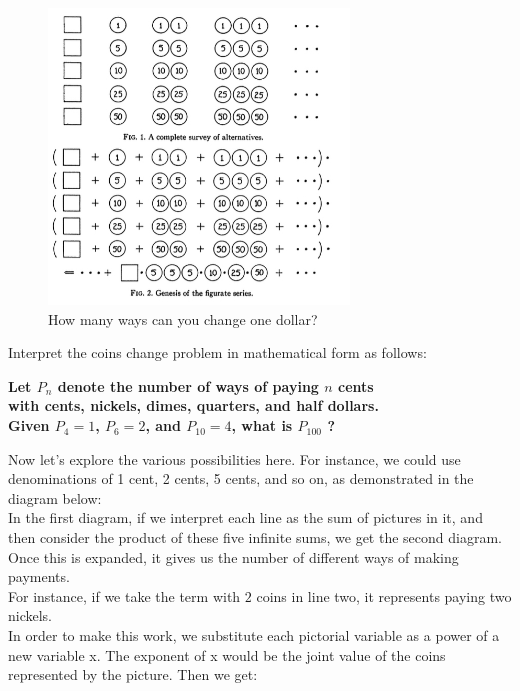 \documentclass{article}
\begin{document}
\begin{figure}[h!]
    \centering
    \includegraphics[width=8cm]{images/coins-change.jpg}
    \caption{How many ways can you change one dollar?}
\end{figure}

\newpage
\noindent Interpret the coins change problem in mathematical form as follows: \\

\noindent 
\begin{center}\textbf{\noindent Let \( P_n \) denote the number of ways of paying \( n \) cents \\ with cents, nickels, dimes, quarters, and half dollars.\\ Given \(P_4=1\), \(P_6=2\), and \(P_{10}=4\), what is \(P_{100}\) ?}
\end{center}

\noindent Now let's explore the various possibilities here. For instance, we could use denominations of 1 cent, 2 cents, 5 cents, and so on, as demonstrated in the diagram below: \\

\noindent In the first diagram, if we interpret each line as the sum of pictures in it, and then consider the product of these five infinite sums, we get the second diagram. Once this is expanded, it gives us the number of different ways of making payments. \\

\noindent For instance, if we take the term with \(2\) coins in line two, it represents paying two nickels. \\

\noindent In order to make this work, we substitute each pictorial variable as a power of a new variable x. The exponent of x would be the joint value of the coins represented by the  picture. Then we get:
\end{document}
